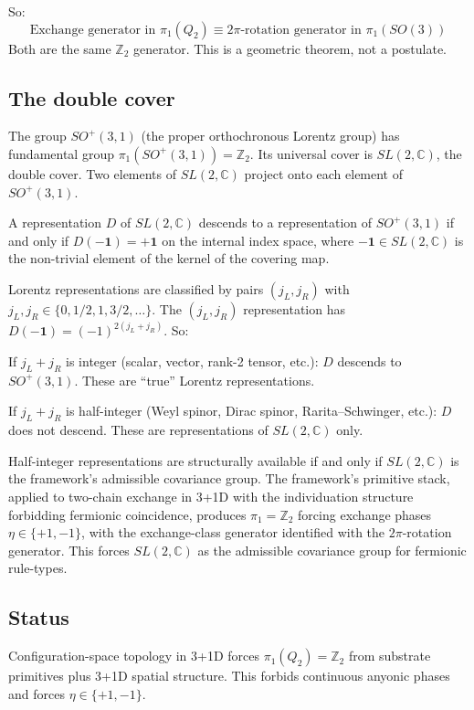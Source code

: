 \documentclass[11pt,a4paper]{article}
\begin{document}
So:
\[
\text{Exchange generator in } \pi_1(Q_2) \equiv 2\pi\text{-rotation generator in } \pi_1(SO(3))
\]
Both are the same $\mathbb{Z}_2$ generator. This is a geometric theorem, not a postulate.

\subsection{The double cover}

The group $SO^+(3,1)$ (the proper orthochronous Lorentz group) has fundamental group $\pi_1(SO^+(3,1)) = \mathbb{Z}_2$. Its universal cover is $SL(2, \mathbb{C})$, the double cover. Two elements of $SL(2, \mathbb{C})$ project onto each element of $SO^+(3,1)$.

A representation $D$ of $SL(2, \mathbb{C})$ descends to a representation of $SO^+(3,1)$ if and only if $D(-\mathbf{1}) = +\mathbf{1}$ on the internal index space, where $-\mathbf{1} \in SL(2, \mathbb{C})$ is the non-trivial element of the kernel of the covering map.

Lorentz representations are classified by pairs $(j_L, j_R)$ with $j_L, j_R \in \{0, 1/2, 1, 3/2, \ldots\}$. The $(j_L, j_R)$ representation has $D(-\mathbf{1}) = (-1)^{2(j_L + j_R)}$. So:

If $j_L + j_R$ is integer (scalar, vector, rank-2 tensor, etc.): $D$ descends to $SO^+(3,1)$. These are ``true'' Lorentz representations.

If $j_L + j_R$ is half-integer (Weyl spinor, Dirac spinor, Rarita--Schwinger, etc.): $D$ does not descend. These are representations of $SL(2, \mathbb{C})$ only.

Half-integer representations are structurally available if and only if $SL(2, \mathbb{C})$ is the framework's admissible covariance group. The framework's primitive stack, applied to two-chain exchange in 3+1D with the individuation structure forbidding fermionic coincidence, produces $\pi_1 = \mathbb{Z}_2$ forcing exchange phases $\eta \in \{+1, -1\}$, with the exchange-class generator identified with the $2\pi$-rotation generator. This forces $SL(2, \mathbb{C})$ as the admissible covariance group for fermionic rule-types.

\subsection{Status}

Configuration-space topology in 3+1D forces $\pi_1(Q_2) = \mathbb{Z}_2$ from substrate primitives plus 3+1D spatial structure. This forbids continuous anyonic phases and forces $\eta \in \{+1, -1\}$.
\end{document}
